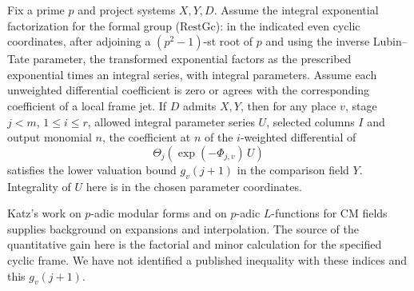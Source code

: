 
\begin{formalstatement}\label{pn:P045}
Fix a prime \(p\) and project systems \(X,Y,D\). Assume the integral exponential factorization for the formal group (\(\mathrm{RestGc}\)): in the indicated even cyclic coordinates, after adjoining a \((p^2-1)\)-st root of \(p\) and using the inverse Lubin--Tate parameter, the transformed exponential factors as the prescribed exponential times an integral series, with integral parameters. Assume each unweighted differential coefficient is zero or agrees with the corresponding coefficient of a local frame jet. If \(D\) admits \(X,Y\), then for any place \(v\), stage \(j<m\), \(1\le i\le r\), allowed integral parameter series \(U\), selected columns \(I\) and output monomial \(n\), the coefficient at \(n\) of the \(i\)-weighted differential of
\[
 \Theta_j\!\left(\exp(-\Phi_{j,v})\,U\right)
\]
satisfies the lower valuation bound \(g_v(j+1)\) in the comparison field \(Y\). Integrality of \(U\) here is in the chosen parameter coordinates.
\end{formalstatement}
Katz's work on \(p\)-adic modular forms and on \(p\)-adic \(L\)-functions for CM fields supplies background on expansions and interpolation. The source of the quantitative gain here is the factorial and minor calculation for the specified cyclic frame. We have not identified a published inequality with these indices and this \(g_v(j+1)\).
